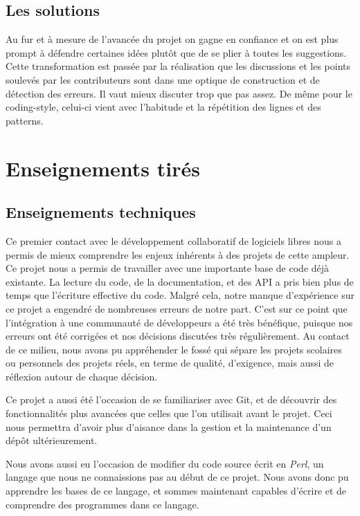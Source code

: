 \documentclass[a4paper, 12pt]{article}
\newcommand{\tech}[1]{\emph{#1}}
\begin{document}
\subsection{Les solutions}

Au fur et à mesure de l'avancée du projet on gagne en confiance et on est plus prompt à défendre certaines idées plutôt que de se plier à toutes les suggestions. Cette transformation est passée par la réalisation que les discussions et les points soulevés par les contributeurs sont dans une optique de construction et de détection des erreurs. Il vaut mieux discuter trop que pas assez.
De même pour le coding-style, celui-ci vient avec l'habitude et la répétition des lignes et des patterns.

\section{Enseignements tirés}

\subsection{Enseignements techniques}

Ce premier contact avec le développement collaboratif de logiciels libres nous a permis de mieux comprendre les enjeux inhérents à des projets de cette ampleur. 
Ce projet nous a permis de travailler avec une importante base de code déjà existante. La lecture du code, de la documentation, et des API a pris bien plus de temps que l'écriture effective du code. Malgré cela, notre manque d'expérience sur ce projet a engendré de nombreuses erreurs de notre part.
C'est sur ce point que l'intégration à une communauté de développeurs a été très bénéfique, puisque nos erreurs ont été corrigées et nos décisions discutées très régulièrement.
Au contact de ce milieu, nous avons pu appréhender le fossé qui sépare les projets scolaires ou personnels des projets réels, en terme de qualité, d'exigence, mais aussi de réflexion autour de chaque décision.


Ce projet a aussi été l'occasion de se familiariser avec Git, et de
découvrir des fonctionnalités plus avancées que celles que l'on utilisait
avant le projet. Ceci nous permettra d'avoir plus d'aisance dans la
gestion et la maintenance d'un dépôt ultérieurement.

Nous avons aussi eu l'occasion de modifier du code source écrit en
\tech{Perl}, un langage que nous ne connaissions pas au début de ce
projet. Nous avons donc pu apprendre les bases de ce langage, et 
sommes maintenant capables d'écrire et de comprendre des
programmes dans ce langage.
\end{document}
